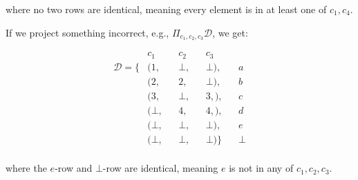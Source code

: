 \documentclass[12pt]{article}
\begin{document}
where no two rows are identical, meaning every element is in at least one of $c_1,c_4$.

If we project something incorrect, e.g., $\Pi_{c_1,c_2,c_3} \mathcal{D}$, we get:

\begin{align*}
                 &  c_1   && c_2   && c_3     &&\\
\mathcal{D} = \{ & (1,    && \bot, && \bot),  && a\\
                 & (2,    && 2,    && \bot),  && b\\
                 & (3,    && \bot, && 3,  ),  && c\\
                 & (\bot, && 4,    && 4,  ),  && d\\
                 & (\bot, && \bot, && \bot),  && e\\
                 & (\bot, && \bot, && \bot)\} && \bot\\
\end{align*}

where the $e$-row and $\bot$-row are identical, meaning $e$ is not in any of $c_1,c_2,c_3$.
\end{document}
